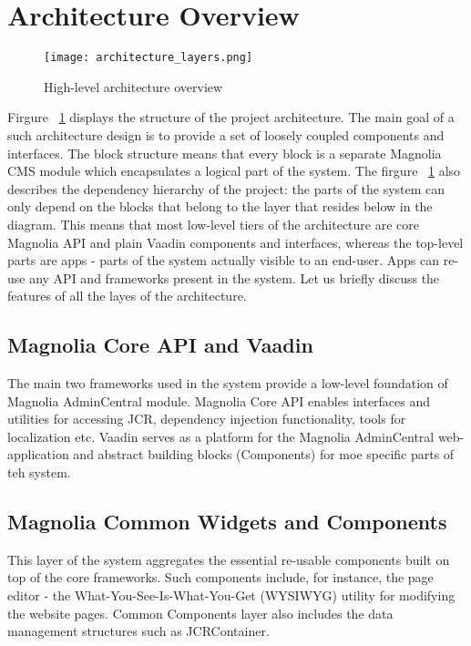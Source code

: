 \section{Architecture Overview}

\begin{figure}[H] \centering \texttt{[image: architecture\_layers.png]}
	\caption{High-level architecture overview}
	\label{fig:architecture_overview}
\end{figure}

Firgure ~\ref{fig:architecture_overview} displays the structure of the project
architecture. The main goal of a such architecture design is to provide a set of loosely
coupled components and interfaces. The block structure means that every block is
a separate Magnolia CMS module which encapsulates a logical part of the system.
The firgure ~\ref{fig:architecture_overview} also describes the dependency
hierarchy of the project: the parts of the system can only depend on the blocks
that belong to the layer that resides below in the diagram. This means that most
low-level tiers of the architecture are core Magnolia API and plain Vaadin
components and interfaces, whereas the top-level parts are apps - parts of the
system actually visible to an end-user. Apps can re-use any API and frameworks
present in the system. Let us briefly discuss the features of all the layes of
the architecture.

\subsection{Magnolia Core API and Vaadin} 
  The main two frameworks used in the system
  provide a low-level foundation of Magnolia AdminCentral module. Magnolia Core
  API enables interfaces and utilities for accessing JCR, dependency injection
  functionality, tools for localization etc. Vaadin serves as a platform for the
  Magnolia AdminCentral web-application and abstract building blocks
  (Components) for moe specific parts of teh system.
\subsection{Magnolia Common Widgets and Components} 
  This layer of the system aggregates the essential re-usable components built on top of the core
  frameworks. Such components include, for instance, the page editor - the
  What-You-See-Is-What-You-Get (WYSIWYG) utility for modifying the website
  pages. Common Components layer also includes the data management structures
  such as JCRContainer.
